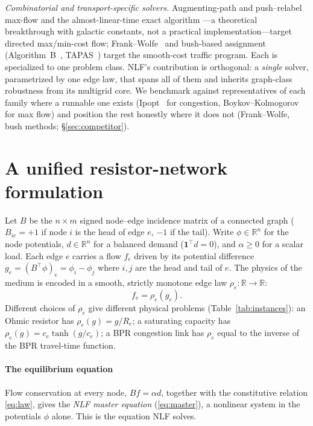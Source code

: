 \documentclass{siamart220329}
\newcommand{\R}{\mathbb{R}}
\begin{document}
\emph{Combinatorial and transport-specific solvers.} Augmenting-path and push--relabel max-flow
\cite{goldberg-tarjan,boykov-kolmogorov} and the almost-linear-time exact algorithm
\cite{chen-almost-linear}---a theoretical breakthrough with galactic constants, not a practical implementation---target directed max/min-cost flow; Frank--Wolfe~\cite{frankwolfe} and
bush-based assignment (Algorithm~B~\cite{bargera2002}, TAPAS~\cite{bargera2010}) target the
smooth-cost traffic program. Each is specialized to one problem class. NLF's contribution is
orthogonal: a \emph{single} solver, parametrized by one edge law, that spans all of them and inherits
graph-class robustness from its multigrid core. We benchmark against representatives of each family
where a runnable one exists (Ipopt~\cite{ipopt} for congestion, Boykov--Kolmogorov
for max flow) and position the rest honestly where it does not (Frank--Wolfe, bush methods; \S\ref{sec:competitor}).

\section{A unified resistor-network formulation}\label{sec:formulation}

Let $B$ be the $n\times m$ signed node--edge incidence matrix of a connected graph ($B_{ie}=+1$ if
node $i$ is the head of edge $e$, $-1$ if the tail). Write $\phi\in\R^n$ for the node
potentials, $d\in\R^n$ for a balanced demand ($\mathbf{1}^{\top}d=0$), and $\alpha\ge0$ for a
scalar load. Each edge $e$ carries a flow $f_e$ driven by its potential difference
$g_e = (B^{\top}\phi)_e = \phi_i - \phi_j$
where $i,j$ are the head and tail of $e$. The physics of the medium is encoded in a smooth,
strictly monotone edge law $\rho_e:\R\to\R$:
\begin{equation}\label{eq:law}
  f_e = \rho_e(g_e).
\end{equation}
Different choices of $\rho_e$ give different physical problems (Table~\ref{tab:instances}): an
Ohmic resistor has $\rho_e(g)=g/R_e$; a saturating capacity has $\rho_e(g)=c_e\tanh(g/c_e)$; a
BPR congestion link has $\rho_e$ equal to the inverse of the BPR travel-time function.

\paragraph{The equilibrium equation}
Flow conservation at every node, $Bf=\alpha d$, together with the constitutive relation
\eqref{eq:law}, gives the \emph{NLF master equation} (\ref{eq:master}), a nonlinear system in the potentials $\phi$ alone. This is the equation NLF solves.
\end{document}
